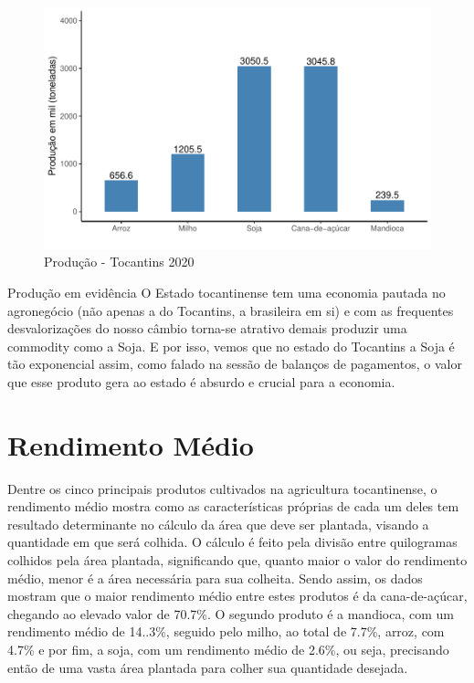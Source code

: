 \begin{figure}[h]
	\caption{Produção - Tocantins 2020}
	\includegraphics[width=\linewidth]{fig/Produção.pdf}
\end{figure}

\begin{smbox}[label={labelbox},nameref={Agricultura}]{Produção em evidência}
	O Estado tocantinense tem uma economia pautada no agronegócio (não apenas a do Tocantins, a brasileira em si) e com as frequentes desvalorizações do nosso câmbio torna-se atrativo demais produzir uma commodity como a Soja. E por isso, vemos que no estado do Tocantins a Soja é tão exponencial assim, como falado na sessão de balanços de pagamentos, o valor que esse produto gera ao estado é absurdo e crucial para a economia.
\end{smbox}

\section{Rendimento Médio}
\par Dentre os cinco principais produtos cultivados na agricultura tocantinense, o rendimento médio mostra como as características próprias de cada um deles tem resultado determinante no cálculo da área que deve ser plantada, visando a quantidade em que será colhida. O cálculo é feito pela divisão entre quilogramas colhidos pela área plantada, significando que, quanto maior o valor do rendimento médio, menor é a área necessária para sua colheita. Sendo assim, os dados mostram que o maior rendimento médio entre estes produtos é da cana-de-açúcar, chegando ao elevado valor de 70.7\%. O segundo produto é a mandioca, com um rendimento médio de 14..3\%, seguido pelo milho, ao total de 7.7\%, arroz, com 4.7\% e por fim, a soja, com um rendimento médio de 2.6\%, ou seja, precisando então de uma vasta área plantada para colher sua quantidade desejada. 

